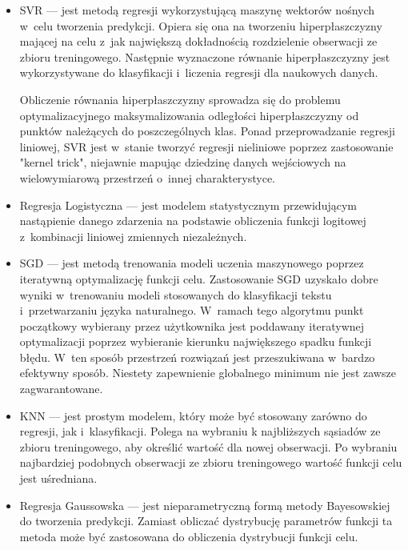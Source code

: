 \begin{itemize}
    \item SVR — jest metodą regresji wykorzystującą maszynę wektorów nośnych w~celu tworzenia
    predykcji. Opiera się ona na tworzeniu hiperpłaszczyzny mającej na celu z~jak największą
    dokładnością rozdzielenie obserwacji ze zbioru treningowego. Następnie wyznaczone
    równanie hiperpłaszczyzny jest wykorzystywane do klasyfikacji i~liczenia regresji dla naukowych
    danych.

    Obliczenie równania hiperpłaszczyzny sprowadza się do problemu optymalizacyjnego
    maksymalizowania odległości hiperpłaszczyzny od punktów należących do poszczególnych klas.
    Ponad przeprowadzanie regresji liniowej, SVR jest w~stanie tworzyć regresji nieliniowe
    poprzez zastosowanie "kernel trick", niejawnie mapując dziedzinę danych wejściowych na 
    wielowymiarową przestrzeń o~innej charakterystyce.
    
    \item Regresja Logistyczna — jest modelem statystycznym przewidującym nastąpienie danego
    zdarzenia na podstawie obliczenia funkcji logitowej z~kombinacji liniowej zmiennych 
    niezależnych.

    \item SGD — jest metodą trenowania modeli uczenia maszynowego poprzez iteratywną optymalizację
    funkcji celu. Zastosowanie SGD uzyskało dobre wyniki w~trenowaniu modeli stosowanych
    do klasyfikacji tekstu i~przetwarzaniu języka naturalnego. W~ramach tego algorytmu
    punkt początkowy wybierany przez użytkownika jest poddawany iteratywnej optymalizacji
    poprzez wybieranie kierunku największego spadku funkcji błędu. W~ten sposób przestrzeń rozwiązań
    jest przeszukiwana w~bardzo efektywny sposób. Niestety zapewnienie globalnego minimum
    nie jest zawsze zagwarantowane.

    \item KNN — jest prostym modelem, który może być stosowany zarówno do regresji, jak i~klasyfikacji.
    Polega na wybraniu k najbliższych sąsiadów ze zbioru treningowego, aby określić wartość dla nowej
    obserwacji. Po wybraniu najbardziej podobnych obserwacji ze zbioru treningowego wartość funkcji
    celu jest uśredniana.

    \item Regresja Gaussowska — jest nieparametryczną formą metody Bayesowskiej do tworzenia
    predykcji. Zamiast obliczać dystrybucję parametrów funkcji ta metoda może być zastosowana do
    obliczenia dystrybucji funkcji celu.
    

\end{itemize}
